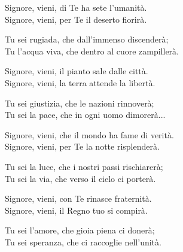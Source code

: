 
\strofa Signore, vieni, di Te ha sete l'umanità.\\
Signore, vieni, per Te il deserto fiorirà.

\spazio

\strofa Tu sei rugiada, che dall'immenso discenderà;\\
Tu l'acqua viva, che dentro al cuore zampillerà.

\spazio


\spazio

\strofa Signore, vieni, il pianto sale dalle città.\\
Signore, vieni, la terra attende la libertà.

\spazio

\strofa Tu sei giustizia, che le nazioni rinnoverà;\\
Tu sei la pace, che in ogni uomo dimorerà...

\spazio


\spazio

\strofa Signore, vieni, che il mondo ha fame di verità.\\
Signore, vieni, per Te la notte risplenderà.

\spazio

\strofa Tu sei la luce, che i nostri passi rischiarerà;\\
Tu sei la via, che verso il cielo ci porterà.

\spazio


\spazio

\strofa Signore, vieni, con Te rinasce fraternità.\\
Signore, vieni, il Regno tuo si compirà.

\spazio

\strofa Tu sei l'amore, che gioia piena ci donerà;\\
Tu sei speranza, che ci raccoglie nell'unità.

\spazio

